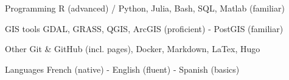 \vspace{-20pt}


\begin{cvskills}

  \cvskill
    {Programming} %
    {R (advanced) / Python, Julia, Bash, SQL, Matlab (familiar)} %

  \cvskill
    {GIS tools} %
    {GDAL, GRASS, QGIS, ArcGIS (proficient) - PostGIS (familiar)} %

  \cvskill
    {Other} %
    {Git \& GitHub (incl. pages), Docker, Markdown, LaTex, Hugo} %

  \cvskill
    {Languages} %
    {French (native) - English (fluent) - Spanish (basics)} %

\end{cvskills}
